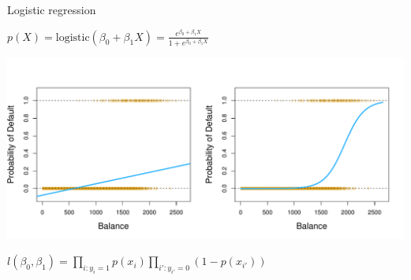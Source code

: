 \documentclass[14pt]{beamer}
\begin{document}
\begin{frame}{Logistic regression}\large

\centerline{$p(X) = \text{logistic}(\beta_0 + \beta_1 X) = \frac{e^{\beta_0 + \beta_1 X}}{1 + e^{\beta_0 + \beta_1 X}} $}

\centerline{\includegraphics[width=\textwidth]{4-2}}

\centerline{$ l(\beta_0, \beta_1) = \prod_{i: y_i = 1} p(x_i) \prod_{i': y_{i'} = 0} (1 - p(x_{i'}))$}


\end{frame}
\end{document}
